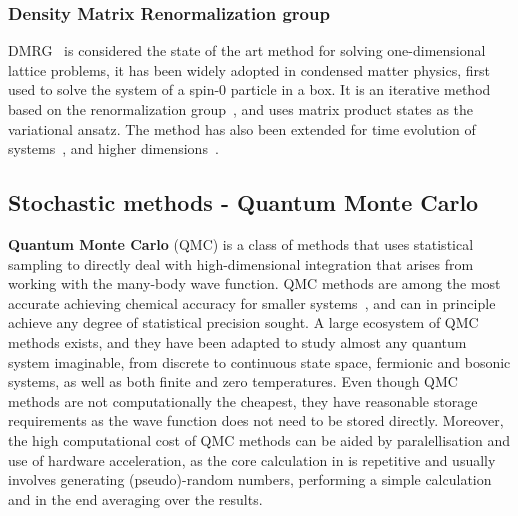\subsubsection{Density Matrix Renormalization group}
DMRG~\cite{white1992density} is considered the state of the art method for solving one-dimensional lattice problems, it has been widely adopted in condensed matter physics, first used to solve the system of a spin-0 particle in a box. It is an iterative method based on the renormalization group~\cite{wilson1975renormalization}, and uses matrix product states as the variational ansatz. The method has also been extended for time evolution of systems~\cite{feiguin2005time}, and higher dimensions~\cite{verstraete2004renormalization}.

\subsection{Stochastic methods - Quantum Monte Carlo}
\label{subsec:qmc-overview}
\textbf{Quantum Monte Carlo} (QMC) is a class of methods that uses statistical sampling to directly deal with high-dimensional integration that arises from working with the many-body wave function. QMC methods are among the most accurate achieving chemical accuracy for smaller systems~\cite{foulkes2001quantum}, and can in principle achieve any degree of statistical precision sought. A large ecosystem of QMC methods exists, and they have been adapted to study almost any quantum system imaginable, from discrete to continuous state space, fermionic and bosonic systems, as well as both finite and zero temperatures. Even though QMC methods are not computationally the cheapest, they have reasonable storage requirements as the wave function does not need to be stored directly. Moreover, the high computational cost of QMC methods can be aided by paralellisation and use of hardware acceleration, as the core calculation in is repetitive and usually involves generating (pseudo)-random numbers, performing a simple calculation and in the end averaging over the results. 

